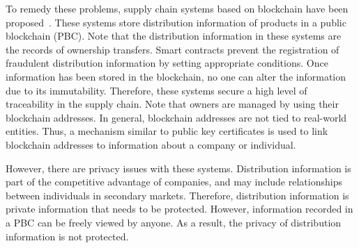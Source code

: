 \documentclass[conference]{IEEEtran}
\begin{document}
To remedy these problems, supply chain systems based on blockchain have been proposed~\cite{Toyoda2017, TRU, HZL19}.
These systems store distribution information of products in a public blockchain (PBC).
Note that the distribution information in these systems are the records of ownership transfers.
Smart contracts prevent the registration of fraudulent distribution information by setting appropriate conditions.
Once information has been stored in the blockchain, no one can alter the information due to its immutability.
Therefore, these systems secure a high level of traceability in the supply chain.
Note that owners are managed by using their blockchain addresses.
In general, blockchain addresses are not tied to real-world entities.
Thus, a mechanism similar to public key certificates is used to link blockchain addresses to information about a company or individual.


However, there are privacy issues with these systems.
Distribution information is part of the competitive advantage of companies, and may include relationships between individuals in secondary markets.
Therefore, distribution information is private information that needs to be protected.
However, information recorded in a PBC can be freely viewed by anyone.
As a result, the privacy of distribution information is not protected.
\end{document}
